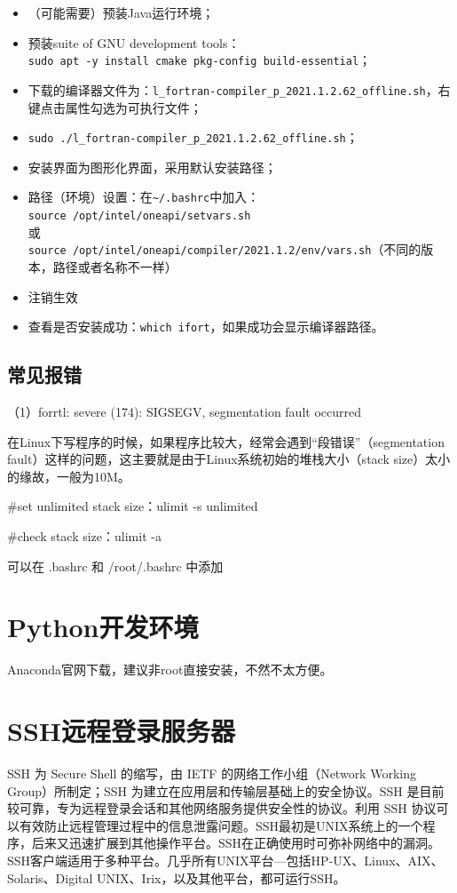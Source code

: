 \begin{itemize}
\item （可能需要）预装Java运行环境；
\item  预装suite of GNU development tools：\\
\verb*|sudo apt -y install cmake pkg-config build-essential|；
\item 下载的编译器文件为：\verb|l_fortran-compiler_p_2021.1.2.62_offline.sh|，右键点击属性勾选为可执行文件；
\item \verb|sudo ./l_fortran-compiler_p_2021.1.2.62_offline.sh|；
\item 安装界面为图形化界面，采用默认安装路径；
\item 路径（环境）设置：在\verb*|~/.bashrc|中加入：\\
\verb|source /opt/intel/oneapi/setvars.sh|\\
或\\
\verb|source /opt/intel/oneapi/compiler/2021.1.2/env/vars.sh|（不同的版本，路径或者名称不一样）
\item 注销生效
\item 查看是否安装成功：\verb|which ifort|，如果成功会显示编译器路径。
\end{itemize}


\subsection{常见报错}
（1）forrtl: severe (174): SIGSEGV, segmentation fault occurred

在Linux下写程序的时候，如果程序比较大，经常会遇到“段错误”（segmentation fault）这样的问题，这主要就是由于Linux系统初始的堆栈大小（stack size）太小的缘故，一般为10M。

\#set unlimited stack size：ulimit -s unlimited

\#check stack size：ulimit -a

可以在 .bashrc 和 /root/.bashrc 中添加



\section{Python开发环境}
Anaconda官网下载，建议非root直接安装，不然不太方便。


\section{SSH远程登录服务器}
SSH 为 Secure Shell 的缩写，由 IETF 的网络工作小组（Network Working Group）所制定；SSH 为建立在应用层和传输层基础上的安全协议。SSH 是目前较可靠，专为远程登录会话和其他网络服务提供安全性的协议。利用 SSH 协议可以有效防止远程管理过程中的信息泄露问题。SSH最初是UNIX系统上的一个程序，后来又迅速扩展到其他操作平台。SSH在正确使用时可弥补网络中的漏洞。SSH客户端适用于多种平台。几乎所有UNIX平台—包括HP-UX、Linux、AIX、Solaris、Digital UNIX、Irix，以及其他平台，都可运行SSH。

